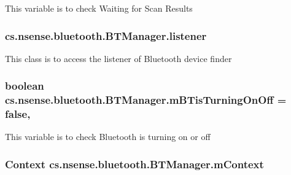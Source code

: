 This variable is to check Waiting for Scan Results \hypertarget{classcs_1_1nsense_1_1bluetooth_1_1_b_t_manager_a5467e47729aa7de424544adaa3a89235}{
\subsubsection[{listener}]{ cs.\-nsense.\-bluetooth.\-B\-T\-Manager.\-listener\hspace{0.3cm}{\ttfamily [private]}}}\label{classcs_1_1nsense_1_1bluetooth_1_1_b_t_manager_a5467e47729aa7de424544adaa3a89235}
This class is to access the listener of Bluetooth device finder \hypertarget{classcs_1_1nsense_1_1bluetooth_1_1_b_t_manager_ad30a16b20b41683db206549e6bdd7e4a}{
\subsubsection[{m\-B\-Tis\-Turning\-On\-Off}]{\setlength{\rightskip}{0pt plus 5cm}boolean cs.\-nsense.\-bluetooth.\-B\-T\-Manager.\-m\-B\-Tis\-Turning\-On\-Off = false\hspace{0.3cm}{\ttfamily [static]}, {\ttfamily [private]}}}\label{classcs_1_1nsense_1_1bluetooth_1_1_b_t_manager_ad30a16b20b41683db206549e6bdd7e4a}
This variable is to check Bluetooth is turning on or off \hypertarget{classcs_1_1nsense_1_1bluetooth_1_1_b_t_manager_a16aad7e01045fb3b9fc6ba0e7115daa2}{
\subsubsection[{m\-Context}]{\setlength{\rightskip}{0pt plus 5cm}Context cs.\-nsense.\-bluetooth.\-B\-T\-Manager.\-m\-Context\hspace{0.3cm}{\ttfamily [private]}}}\label{classcs_1_1nsense_1_1bluetooth_1_1_b_t_manager_a16aad7e01045fb3b9fc6ba0e7115daa2}
